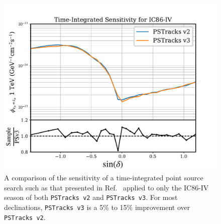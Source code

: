\documentclass[aps,10pt,prd,twocolumn,floats,letterpaper,showpacs,nofootinbib,bibnotes,notitlepage,superscriptaddress,floatfix]{revtex4-1}
\begin{document}
\begin{figure}[p]
\centering
\includegraphics[width=0.5\linewidth,viewport= 0 0 530 390, clip=false]{./TXSCheckPlots/v2v3_senscompare.pdf}
\caption[]{A comparison of the sensitivity of a time-integrated point source search such as that presented in Ref.~\cite{Aartsen:2019fau} applied to only the IC86-IV season of both {\tt PSTracks v2} and {\tt PSTracks v3}. For most declinations, {\tt PSTracks v3} is a 5\% to 15\% improvement over {\tt PSTracks v2}.}\label{fig:v2v3senscompare}
\end{figure}
\end{document}
